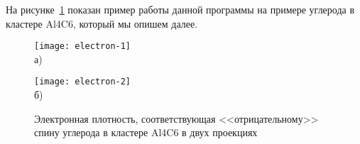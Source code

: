 На рисунке~\cref{fig:electron-densities} показан пример работы данной программы на примере углерода в кластере Al4C6,
который мы опишем далее.

\begin{figure}[ht]
    \begin{minipage}[b][][b]{0.49\linewidth}\centering
        \texttt{[image: electron-1]} \\ а)
    \end{minipage}
    \hfill
    \begin{minipage}[b][][b]{0.49\linewidth}\centering
        \texttt{[image: electron-2]} \\ б)
    \end{minipage}
    \caption{Электронная плотность, соответствующая <<отрицательному>> спину углерода в кластере Al4C6 в двух проекциях}
    \label{fig:electron-densities}
\end{figure}

\FloatBarrier
